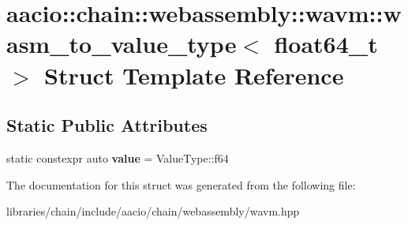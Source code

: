 \hypertarget{structaacio_1_1chain_1_1webassembly_1_1wavm_1_1wasm__to__value__type_3_01float64__t_01_4}{}\section{aacio\+:\+:chain\+:\+:webassembly\+:\+:wavm\+:\+:wasm\+\_\+to\+\_\+value\+\_\+type$<$ float64\+\_\+t $>$ Struct Template Reference}
\label{structaacio_1_1chain_1_1webassembly_1_1wavm_1_1wasm__to__value__type_3_01float64__t_01_4}
\subsection*{Static Public Attributes}
\begin{DoxyCompactItemize}
\item 
\mbox{\label{structaacio_1_1chain_1_1webassembly_1_1wavm_1_1wasm__to__value__type_3_01float64__t_01_4_adeeaee04fe533ed5e6c3d1af8b11e542}} 
static constexpr auto {\bfseries value} = Value\+Type\+::f64
\end{DoxyCompactItemize}


The documentation for this struct was generated from the following file\+:\begin{DoxyCompactItemize}
\item 
libraries/chain/include/aacio/chain/webassembly/wavm.\+hpp\end{DoxyCompactItemize}

